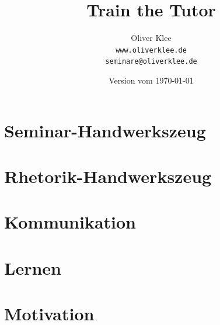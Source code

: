 \documentclass[a4paper,openany,twoside,titlepage,10pt,headsepline]{scrbook}
\title{Train the Tutor}
\author{Oliver Klee\\\texttt{www.oliverklee.de}\\\texttt{seminare@oliverklee.de}}
\date{Version vom \today}
\begin{document}
    \frontmatter

    \maketitle

    \tableofcontents

    \mainmatter


    \chapter{Seminar-Handwerkszeug}
    
    
    
    
    

    

    


    \chapter{Rhetorik-Handwerkszeug}
    
    
    


    \chapter{Kommunikation}
    
    
    
    
    


    \chapter{Lernen}
    

    
    
    
    

    


    \chapter{Motivation}
    

    
\end{document}
